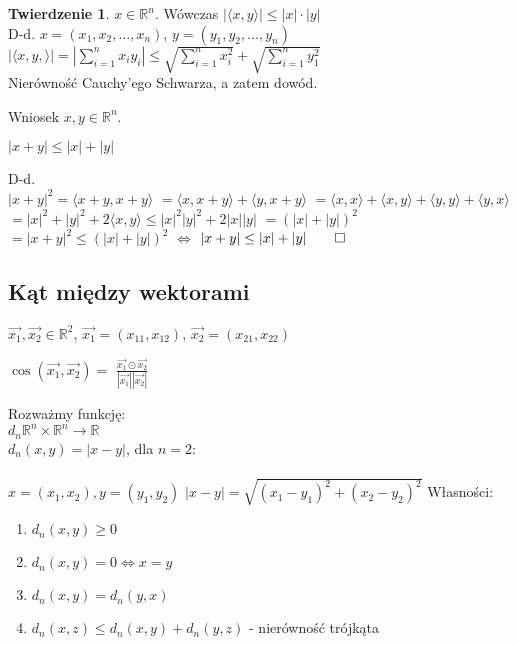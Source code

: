 \documentclass{article}
\theoremstyle{definition}
\theoremstyle{definition}
\newtheorem{tw}{Twierdzenie}[subsection]
\theoremstyle{definition}
\theoremstyle{definition}
\begin{document}
\begin{tw}
	$x\in\mathbb{R}^n$. Wówczas $|\langle x,y \rangle| \leq |x|\cdot |y|$\\
	D-d. $x=(x_1,x_2,\dots,x_n)$, $y=(y_1,y_2,\dots, y_n)$\\
	$|\langle x,y, \rangle| = |\sum_{i=1}^{n} x_i y_i| \leq \sqrt{\sum_{i=1}^{n} x_i^2} + \sqrt{\sum_{i=1}^{n} y_1^2}$\\
	Nierówność Cauchy'ego Schwarza, a zatem dowód.
\end{tw}
Wniosek $x,y\in\mathbb{R}^n$.
\begin{center}
	$|x+y| \leq |x| + |y|$
\end{center}
D-d.\\
$|x+y|^2=\langle x+y, x+y \rangle$
$= \langle x, x+y \rangle + \langle y, x+y \rangle$
$= \langle x, x \rangle + \langle x, y \rangle + \langle y, y \rangle + \langle y, x \rangle$
$=|x|^2+|y|^2 + 2\langle x,y \rangle \leq |x|^2 |y|^2 + 2|x||y|$
$=(|x|+|y|)^2$
$=|x+y|^2 \leq (|x|+|y|)^2$
$\iff$
$|x+y| \leq |x| + |y|\qed$

\subsection{Kąt między wektorami}

$\overrightarrow{x_1}, \overrightarrow{x_2} \in \mathbb{R}^2$,
$\overrightarrow{x_1} = (x_{11}, x_{12})$,
$\overrightarrow{x_2} = (x_{21}, x_{22})$\\
\begin{center}
    $\cos(\overrightarrow{x_1}, \overrightarrow{x_2})=$
    $\frac{\overrightarrow{x_1} \odot \overrightarrow{x_2}}{|\overrightarrow{x_1}||\overrightarrow{x_2}|}$
\end{center}
Rozważmy funkcję:\\
$d_n \mathbb{R}^n \times \mathbb{R}^n \rightarrow \mathbb{R}$\\
$d_n(x,y) = |x-y|$, dla $n=2$:\\\\
$x=(x_1,x_2), y=(y_1,y_2)$
$|x-y| = \sqrt{(x_1-y_1)^2+(x_2-y_2)^2}$
Własności:
\begin{enumerate}
    \item $d_n(x,y)\geq 0$
    \item $d_n(x,y)=0 \iff x=y$
    \item $d_n(x,y)=d_n(y,x)$
    \item $d_n(x,z)\leq d_n(x,y) + d_n(y,z)$ - nierówność trójkąta
\end{enumerate}
\end{document}
